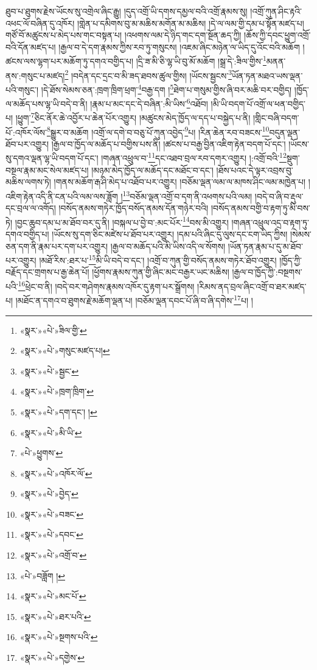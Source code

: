 ཐུབ་པ་ཐུགས་རྗེས་ཡོངས་སུ་འགྲེལ་ཞིང་རྒྱུ། །དུད་འགྲོ་ཡི་དགས་དམྱལ་བའི་འགྲོ་རྣམས་སུ། །འགྲོ་ཀུན་ཤིང་རྟའི་འཕང་ལོ་བཞིན་དུ་འཁོར། །གླེན་པ་དམིགས་བུ་མ་མཆིས་མགོན་མ་མཆིས། །དེ་ལ་ལམ་གྱི་དམ་པ་སྟོན་མཛད་པ། གཙོ་བོ་མཚུངས་པ་མེད་པས་གང་བསྟན་པ། །འཕགས་ལམ་དེ་ཉིད་གང་དག་སྔོན་ཆད་ཀྱི། །ཆོས་ཀྱི་དབང་ཕྱུག་འགྲོ་བའི་དོན་མཛད་པ། །རྒྱལ་བ་དེ་དག་རྣམས་ཀྱིས་རབ་ཏུ་གསུངས། །འཇམ་ཞིང་མཉེན་ལ་ཡིད་དུ་འོང་བའི་མཆོག །ཚངས་ལས་ལྷག་པར་མཆོག་ཏུ་དགའ་བགྱིད་པ། །དྲི་ཟ་མི་ཅི་ལྷ་ཡི་བུ་མོ་མཆོག །སྒྲ་དེ་:ཟིལ་གྱིས་\footnote{«སྣར་»«པེ་»ཟིལ་གྱི་}མནན་ནས་:གསུང་པ་མཛད།\footnote{«སྣར་»«པེ་»གསུང་མཛད་པ།} །བདེན་དང་དྲང་བ་མི་ཟད་ཐབས་ཚུལ་གྱིས། །ཡོངས་སྦྱངས་\footnote{«སྣར་»«པེ་»སྦྱང་}ཡོན་ཏན་མཐའ་ཡས་ལྡན་པའི་གསུང་། །དེ་ཐོས་སེམས་ཅན་:ཁྲག་ཁྲིག་ཕྲག་\footnote{«སྣར་»«པེ་»ཁྲག་ཁྲིག་}བརྒྱ་དག །\footnote{«སྣར་»«པེ་»དག་དང་། །}ཐེག་པ་གསུམ་གྱིས་ཞི་བར་མཆི་བར་བགྱིད། །ཁྱོད་ལ་མཆོད་པས་ལྷ་ཡི་བདེ་བ་ནི། །རྣམ་པ་མང་དང་དེ་བཞིན་:མི་ཡིས་\footnote{«སྣར་»«པེ་»མི་ཡི་}འཐོབ། །མི་ཡི་བདག་པོ་འགྲོ་ལ་ཕན་བགྱིད་པ། །ཕྱུག་\footnote{«པེ་»ཕྱུགས་}ཅིང་ནོར་ཆེ་འབྱོར་པ་ཆེན་པོར་འགྱུར། །མཚུངས་མེད་ཁྱོད་ལ་དད་པ་བསྐྱེད་པ་ནི། །གླིང་བཞི་བདག་པོ་:འཁོར་ལོས་\footnote{«སྣར་»«པེ་»འཁོར་ལོ་}སྒྱུར་བ་མཆོག །འགྲོ་ལ་དགེ་བ་བཅུ་པོ་ཀུན་འབྱེད་\footnote{«སྣར་»«པེ་»བྱེད་}པ། །རིན་ཆེན་རབ་བཟངས་\footnote{«སྣར་»«པེ་»བཟང་}བདུན་ལྡན་ཐོབ་པར་འགྱུར། །རྒྱལ་བ་ཁྱོད་ལ་མཆོད་པ་བགྱིས་པས་ནི། །ཚངས་པ་བརྒྱ་བྱིན་འཇིག་རྟེན་བདག་པོ་དང་། །ཡོངས་སུ་དགའ་ལྡན་ལྷ་ཡི་བདག་པོ་དང་། །གཞན་འཕྲུལ་བ་\footnote{«སྣར་»«པེ་»དབང་}དང་འཐབ་བྲལ་རབ་དགར་འགྱུར། །:འགྲོ་བའི་\footnote{«སྣར་»«པེ་»འགྲོ་བ་}སྡུག་བསྔལ་རྣམ་མང་སེལ་མཛད་པ། །མཉམ་མེད་ཁྱོད་ལ་མཆོད་དང་མཐོང་བ་དང་། །ཐོས་པའང་དེ་ལྟར་འབྲས་བུ་མཆིས་ལགས་ཏེ། །གནས་མཆོག་རྒ་ཤི་མེད་པ་འཐོབ་པར་འགྱུར། །བཅོམ་ལྡན་ལམ་ལ་མཁས་ཤིང་ལམ་མཁྱེན་པ། །འཇིག་རྟེན་འདི་ནི་ངན་པའི་ལམ་ལས་ཟློག །\footnote{«པེ་»བཟློག །}བཅོམ་ལྡན་འགྲོ་བ་དག་ནི་འཕགས་པའི་ལམ། །བདེ་བ་ཞི་བ་རྡུལ་དང་བྲལ་ལ་འགོད། །བསོད་ནམས་གཏེར་ཁྱོད་བསོད་ནམས་དོན་གཉེར་བའི། །བསོད་ནམས་བགྱི་བ་རྟག་ཏུ་མི་བས་ཏེ། །བྱང་ཆུབ་དམ་པ་མ་ཐོབ་བར་དུ་ནི། །བསྐལ་པ་བྱེ་བ་:མང་པོར་\footnote{«སྣར་»«པེ་»མང་པོ་}བས་མི་འགྱུར། །གཞན་འཕྲུལ་འདྲ་བ་རྟག་ཏུ་དགའ་བགྱིད་པ། །ཡོངས་སུ་དག་ཅིང་མཛེས་པ་ཐོབ་པར་འགྱུར། །དམ་པའི་ཞིང་དུ་ལུས་དང་ངག་ཡིད་ཀྱིས། །སེམས་ཅན་དག་ནི་རྣམ་པར་དག་པར་འགྱུར། །རྒྱལ་བ་མཆོད་པའི་མི་ཡིས་འདི་ལ་སོགས། །ཡོན་ཏན་རྣམ་པ་དུ་མ་ཐོབ་པར་འགྱུར། །མཐོ་རིས་:ཐར་པ་\footnote{«སྣར་»«པེ་»ཐར་པའི་}མི་ཡི་བདེ་བ་དང་། །འགྲོ་བ་ཀུན་གྱི་བསོད་ནམས་གཏེར་ཐོབ་འགྱུར། །ཁྱོད་ཀྱི་བརྗོད་དང་གྲགས་པ་རྒྱ་ཆེན་པོ། །ཕྱོགས་རྣམས་ཀུན་གྱི་ཞིང་མང་བརྒྱར་ཡང་མཆིས། །རྒྱལ་བ་ཁྱོད་ཀྱི་:བསྔགས་པའི་\footnote{«སྣར་»«པེ་»སྔགས་པའི་}ཕྲེང་བ་ནི། །བདེ་བར་གཤེགས་རྣམས་འཁོར་དུ་རྟག་པར་སྒྲོགས། །རིམས་ནད་བྲལ་ཞིང་འགྲོ་བ་ཐར་མཛད་པ། །མཐོང་ན་དགའ་བ་ཐུགས་རྗེ་མཆོག་ལྡན་པ། །བཅོམ་ལྡན་དབང་པོ་ཞི་བ་ཞི་དགེས་\footnote{«སྣར་»«པེ་»དགྱེས་}པ། །
